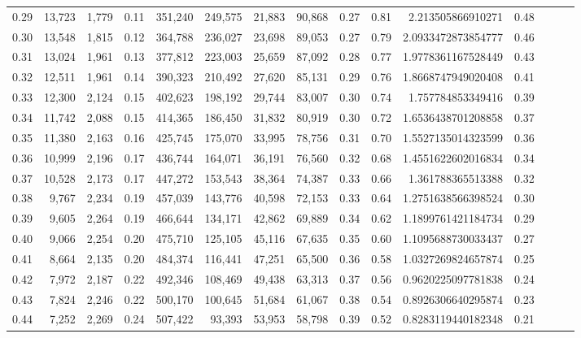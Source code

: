 \begin{tabular}{rrrrrrrrrrrrrrr}
0.29 &  13,723 &  1,779 &  0.11 &  351,240 &  249,575 &   21,883 &   90,868 &  0.27 &  0.81 &     2.213505866910271 &      0.48 \\
0.30 &  13,548 &  1,815 &  0.12 &  364,788 &  236,027 &   23,698 &   89,053 &  0.27 &  0.79 &    2.0933472873854777 &      0.46 \\
0.31 &  13,024 &  1,961 &  0.13 &  377,812 &  223,003 &   25,659 &   87,092 &  0.28 &  0.77 &    1.9778361167528449 &      0.43 \\
0.32 &  12,511 &  1,961 &  0.14 &  390,323 &  210,492 &   27,620 &   85,131 &  0.29 &  0.76 &    1.8668747949020408 &      0.41 \\
0.33 &  12,300 &  2,124 &  0.15 &  402,623 &  198,192 &   29,744 &   83,007 &  0.30 &  0.74 &     1.757784853349416 &      0.39 \\
0.34 &  11,742 &  2,088 &  0.15 &  414,365 &  186,450 &   31,832 &   80,919 &  0.30 &  0.72 &    1.6536438701208858 &      0.37 \\
0.35 &  11,380 &  2,163 &  0.16 &  425,745 &  175,070 &   33,995 &   78,756 &  0.31 &  0.70 &    1.5527135014323599 &      0.36 \\
0.36 &  10,999 &  2,196 &  0.17 &  436,744 &  164,071 &   36,191 &   76,560 &  0.32 &  0.68 &    1.4551622602016834 &      0.34 \\
0.37 &  10,528 &  2,173 &  0.17 &  447,272 &  153,543 &   38,364 &   74,387 &  0.33 &  0.66 &     1.361788365513388 &      0.32 \\
0.38 &   9,767 &  2,234 &  0.19 &  457,039 &  143,776 &   40,598 &   72,153 &  0.33 &  0.64 &    1.2751638566398524 &      0.30 \\
0.39 &   9,605 &  2,264 &  0.19 &  466,644 &  134,171 &   42,862 &   69,889 &  0.34 &  0.62 &    1.1899761421184734 &      0.29 \\
0.40 &   9,066 &  2,254 &  0.20 &  475,710 &  125,105 &   45,116 &   67,635 &  0.35 &  0.60 &    1.1095688730033437 &      0.27 \\
0.41 &   8,664 &  2,135 &  0.20 &  484,374 &  116,441 &   47,251 &   65,500 &  0.36 &  0.58 &    1.0327269824657874 &      0.25 \\
0.42 &   7,972 &  2,187 &  0.22 &  492,346 &  108,469 &   49,438 &   63,313 &  0.37 &  0.56 &    0.9620225097781838 &      0.24 \\
0.43 &   7,824 &  2,246 &  0.22 &  500,170 &  100,645 &   51,684 &   61,067 &  0.38 &  0.54 &    0.8926306640295874 &      0.23 \\
0.44 &   7,252 &  2,269 &  0.24 &  507,422 &   93,393 &   53,953 &   58,798 &  0.39 &  0.52 &    0.8283119440182348 &      0.21 \\

\end{tabular}
